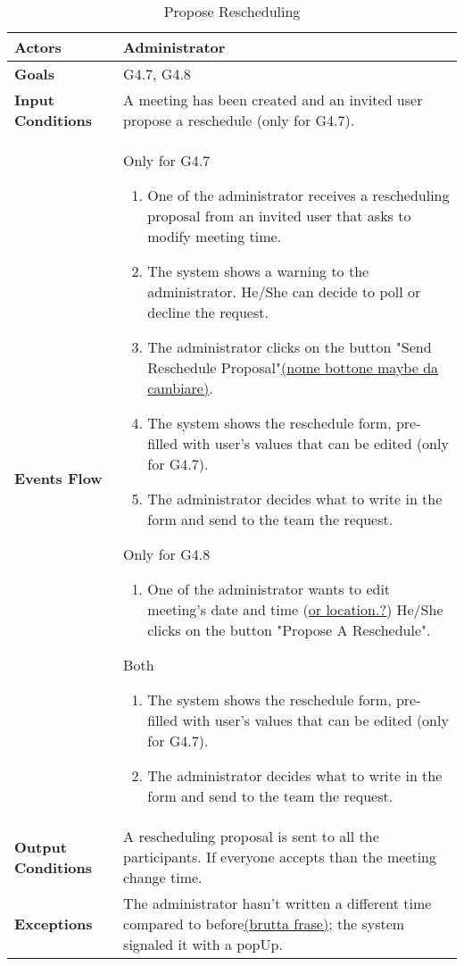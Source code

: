 \begin{table}[H]
	\centering
	\def\arraystretch{1.5}
	\begin{tabular}{|p{7cm}|p{7cm}|}
		\hline
		\textbf{Actors}           & Administrator    \\ \hline
		\textbf{Goals}            & G4.7, G4.8           \\ \hline
		{\textbf{Input Conditions}}  & A meeting has been created and an invited user propose a reschedule (only for G4.7).           \\ \hline
		{\textbf{Events Flow}}       & Only for G4.7
		\begin{enumerate}[topsep=0pt, leftmargin=*]				
			\item One of the administrator receives a rescheduling proposal from an invited user that asks to modify meeting time.
			\item The system shows a warning to the administrator. He/She can decide to poll  or decline the request.
			\item The administrator clicks on the button "Send Reschedule Proposal"\underline{(nome bottone maybe da cambiare)}.
			\item The system shows the reschedule form, pre-filled with user's values that can be edited (only for G4.7).
			\item The administrator decides what to write in the form and send to the team the request.
		\end{enumerate}
		Only for G4.8
		\begin{enumerate}[topsep=0pt, leftmargin=*]
			\item One of the administrator wants to edit meeting's date and time (\underline{or location.?}) He/She clicks on the button "Propose A Reschedule".
		\end{enumerate}  
		Both
		\begin{enumerate}[topsep=0pt, leftmargin=*]
			\item The system shows the reschedule form, pre-filled with user's values that can be edited (only for G4.7).
			\item The administrator decides what to write in the form and send to the team the request.
		\end{enumerate}                         \\ \hline
		\textbf{Output Conditions} & A rescheduling proposal is sent to all the participants. If everyone accepts than the meeting change time.         \\ \hline
		\textbf{Exceptions}        & The administrator hasn't written a different time compared to before\underline{(brutta frase)}; the system signaled it with a popUp.        \\ \hline
	\end{tabular}
	\caption{Propose Rescheduling}
\end{table}